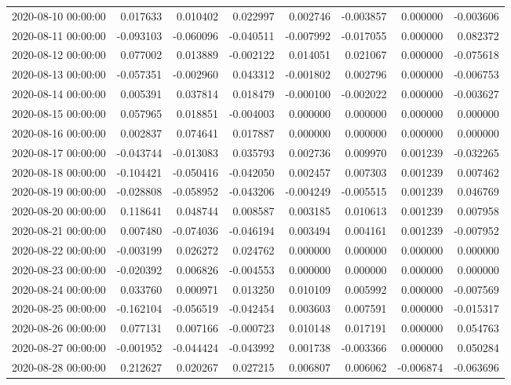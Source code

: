 \begin{tabular}{lrrrrrrr}
2020-08-10 00:00:00 & 0.017633 & 0.010402 & 0.022997 & 0.002746 & -0.003857 & 0.000000 & -0.003606 \\
2020-08-11 00:00:00 & -0.093103 & -0.060096 & -0.040511 & -0.007992 & -0.017055 & 0.000000 & 0.082372 \\
2020-08-12 00:00:00 & 0.077002 & 0.013889 & -0.002122 & 0.014051 & 0.021067 & 0.000000 & -0.075618 \\
2020-08-13 00:00:00 & -0.057351 & -0.002960 & 0.043312 & -0.001802 & 0.002796 & 0.000000 & -0.006753 \\
2020-08-14 00:00:00 & 0.005391 & 0.037814 & 0.018479 & -0.000100 & -0.002022 & 0.000000 & -0.003627 \\
2020-08-15 00:00:00 & 0.057965 & 0.018851 & -0.004003 & 0.000000 & 0.000000 & 0.000000 & 0.000000 \\
2020-08-16 00:00:00 & 0.002837 & 0.074641 & 0.017887 & 0.000000 & 0.000000 & 0.000000 & 0.000000 \\
2020-08-17 00:00:00 & -0.043744 & -0.013083 & 0.035793 & 0.002736 & 0.009970 & 0.001239 & -0.032265 \\
2020-08-18 00:00:00 & -0.104421 & -0.050416 & -0.042050 & 0.002457 & 0.007303 & 0.001239 & 0.007462 \\
2020-08-19 00:00:00 & -0.028808 & -0.058952 & -0.043206 & -0.004249 & -0.005515 & 0.001239 & 0.046769 \\
2020-08-20 00:00:00 & 0.118641 & 0.048744 & 0.008587 & 0.003185 & 0.010613 & 0.001239 & 0.007958 \\
2020-08-21 00:00:00 & 0.007480 & -0.074036 & -0.046194 & 0.003494 & 0.004161 & 0.001239 & -0.007952 \\
2020-08-22 00:00:00 & -0.003199 & 0.026272 & 0.024762 & 0.000000 & 0.000000 & 0.000000 & 0.000000 \\
2020-08-23 00:00:00 & -0.020392 & 0.006826 & -0.004553 & 0.000000 & 0.000000 & 0.000000 & 0.000000 \\
2020-08-24 00:00:00 & 0.033760 & 0.000971 & 0.013250 & 0.010109 & 0.005992 & 0.000000 & -0.007569 \\
2020-08-25 00:00:00 & -0.162104 & -0.056519 & -0.042454 & 0.003603 & 0.007591 & 0.000000 & -0.015317 \\
2020-08-26 00:00:00 & 0.077131 & 0.007166 & -0.000723 & 0.010148 & 0.017191 & 0.000000 & 0.054763 \\
2020-08-27 00:00:00 & -0.001952 & -0.044424 & -0.043992 & 0.001738 & -0.003366 & 0.000000 & 0.050284 \\
2020-08-28 00:00:00 & 0.212627 & 0.020267 & 0.027215 & 0.006807 & 0.006062 & -0.006874 & -0.063696 \\

\end{tabular}
